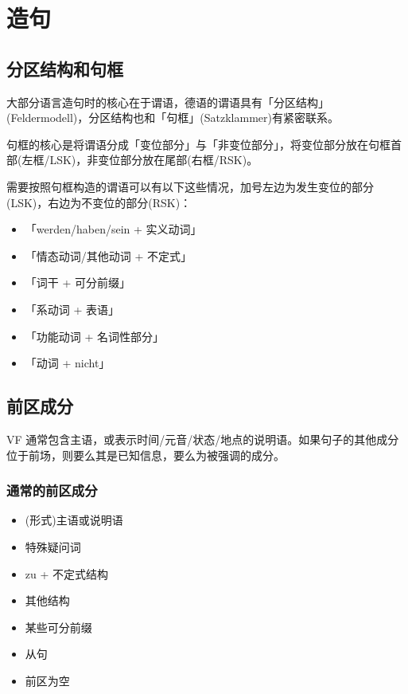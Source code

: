 \section{造句}


\subsection{分区结构和句框}
\begin{figure}[H]
    \centering
    
\end{figure}

大部分语言造句时的核心在于谓语，德语的谓语具有「分区结构」(Feldermodell)，分区结构也和「句框」(Satzklammer)有紧密联系。

句框的核心是将谓语分成「变位部分」与「非变位部分」，将变位部分放在句框首部(左框/LSK)，非变位部分放在尾部(右框/RSK)。

需要按照句框构造的谓语可以有以下这些情况，加号左边为发生变位的部分(LSK)，右边为不变位的部分(RSK)：
\begin{itemize}
    \item「werden/haben/sein + 实义动词」
    \item 「情态动词/其他动词 + 不定式」
    \item 「词干 + 可分前缀」
    \item 「系动词 + 表语」
    \item 「功能动词 + 名词性部分」
    \item 「动词 + nicht」
\end{itemize}

\subsection{前区成分}
VF 通常包含主语，或表示时间/元音/状态/地点的说明语。如果句子的其他成分位于前场，则要么其是已知信息，要么为被强调的成分。

\subsubsection{通常的前区成分}

\begin{itemize}
    \item (形式)主语或说明语


    \item 特殊疑问词
    \item zu + 不定式结构
    \item 其他结构
    \item 某些可分前缀
    \item 从句
    \item 前区为空
\end{itemize}


